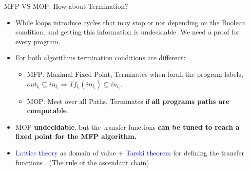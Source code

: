 \begin{frame}{MFP VS MOP: How about Termination?}
\begin{itemize}
\item While loops introduce cycles that may stop or not depending on the Boolean condition, and getting this information is undecidable. We need a proof for every program.
\item For both algorithms termination conditions are different:
\begin{itemize}
	\item MFP: Maximal Fixed Point, Terminates when forall the program labels, \textbf{$out_{l_i} \subseteq in_{l_i} \Rightarrow Tf_{l_i}(in_{l_i}) \subseteq in_{l_i}$}.
	\item MOP: Meet over all Paths, Terminates if \textbf{all programs paths are computable}. 
\end{itemize}
\item MOP \textbf{undecidable}, but the transfer functions \textbf{can be tuned to reach a fixed point for the MFP algorithm.}
\item \textcolor{blue}{Lattice theory} as domain of value  + \textcolor{blue}{Tarski theorem} for defining the transfer functions . (The rule of the ascendant chain)
\end{itemize}
\end{frame}

